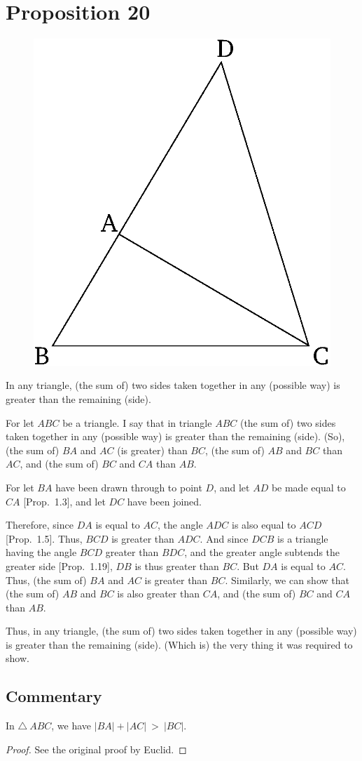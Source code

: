 \chapter*{Proposition 20}
\label{prop:20}

\begin{figure}[ht]
    \begin{center}
    \includegraphics[width=0.5\linewidth]{figures/fig20e.eps}
    \label{fig:prop_20}
    \end{center}
\end{figure}

In any triangle, (the sum of) two sides taken together in any (possible way) is greater than the remaining (side).

For let $ABC$ be a triangle. I say that in triangle $ABC$ (the sum of) two
sides taken together in
any (possible way) is greater than the remaining (side). (So), (the sum of) $BA$ and $AC$ (is greater) than $BC$,
(the sum of) $AB$ and $BC$ than $AC$, and (the sum of) $BC$ and $CA$ than $AB$.

For let $BA$ have been drawn through to point $D$, and let $AD$ be made equal to $CA$ [Prop.~1.3], and let $DC$ have been joined.

Therefore, since $DA$ is equal to $AC$, the angle $ADC$ is also equal to
$ACD$ [Prop.~1.5]. Thus, $BCD$ is greater than $ADC$. And since
 $DCB$ is a triangle having the angle $BCD$ greater than $BDC$, and the
greater angle subtends the greater side [Prop.~1.19], $DB$ is thus
greater than $BC$. But $DA$ is equal to $AC$. Thus, (the sum of) $BA$ and $AC$ is
greater than $BC$. Similarly, we can show that (the sum of) $AB$ and $BC$ is also
greater than $CA$, and (the sum of) $BC$ and $CA$ than $AB$.

Thus, in any triangle, (the sum of) two sides taken together in any (possible way) is greater than the remaining (side). (Which is) the very thing
it was required to show.


\section*{Commentary}

\begin{proposition}\label{proposition_20}\leanok
    In $\triangle~ABC$, we have $|BA| + |AC|~>~|BC|$.
\end{proposition}
\begin{proof}
    \leanok
    See the original proof by Euclid.
\end{proof}
